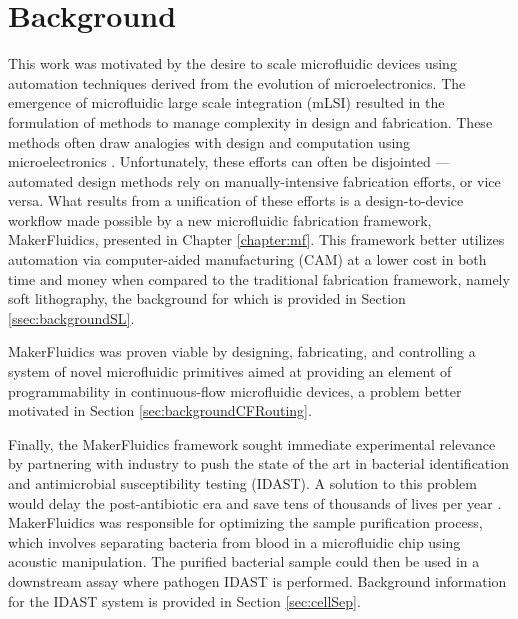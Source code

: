 \chapter{Background}
\label{chapter:background}
\thispagestyle{myheadings}

\graphicspath{{1a_background/Figures/}}

This work was motivated by the desire to scale microfluidic devices using automation techniques derived from the evolution of microelectronics. The emergence of microfluidic large scale integration (mLSI) resulted in the formulation of methods to manage complexity in design and fabrication. These methods often draw analogies with design and computation using microelectronics \cite{minhass2013}. Unfortunately, these efforts can often be disjointed --- automated design methods rely on manually-intensive fabrication efforts, or vice versa. What results from a unification of these efforts is a design-to-device workflow made possible by a new microfluidic fabrication framework, MakerFluidics, presented in Chapter \ref{chapter:mf}. This framework better utilizes automation via computer-aided manufacturing (CAM) at a lower cost in both time and money when compared to the traditional fabrication framework, namely soft lithography, the background for which is provided in Section \ref{ssec:backgroundSL}.

MakerFluidics was proven viable by designing, fabricating, and controlling a system of novel microfluidic primitives aimed at providing an element of programmability in continuous-flow microfluidic devices, a problem better motivated in Section \ref{sec:backgroundCFRouting}. 

Finally, the MakerFluidics framework sought immediate experimental relevance by partnering with industry to push the state of the art in bacterial identification and antimicrobial susceptibility testing (IDAST). A solution to this problem would delay the post-antibiotic era \cite{alanis2005resistance} and save tens of thousands of lives per year \cite{world2004world}. MakerFluidics was responsible for optimizing the sample purification process, which involves separating bacteria from blood in a microfluidic chip using acoustic manipulation. The purified bacterial sample could then be used in a downstream assay where pathogen IDAST is performed. Background information for the IDAST system is provided in Section \ref{sec:cellSep}.

